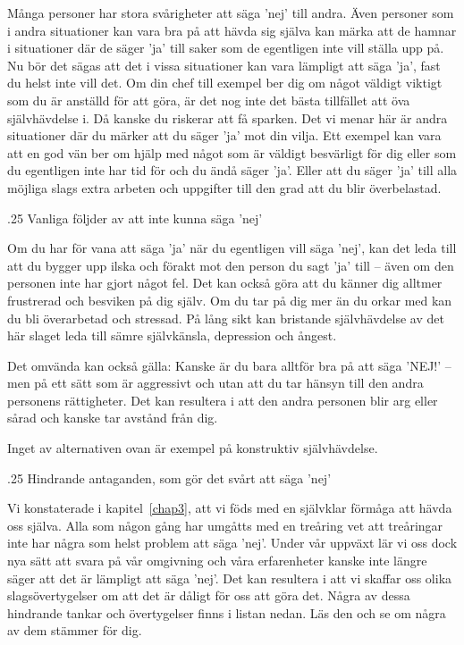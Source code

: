 \documentclass[swedish,a4paper]{book}
\makeatletter
\renewcommand\subsection{\@startsection{subsection}{1}{\z@}%
                                   {\baselineskip}%
                                   {.25\baselineskip}%
                                   {\fontsize{1\baselineskip}{1.25\baselineskip}\selectfont\sffamily\bfseries}} %
\makeatother
\begin{document}
Många personer har stora svårigheter att säga 'nej' till andra. Även personer som i andra situationer kan vara bra på att hävda sig själva kan märka att de hamnar i situationer där de säger 'ja' till saker som de egentligen inte vill ställa upp på. Nu bör det sägas att det i vissa situationer kan vara lämpligt att säga 'ja', fast du helst inte vill det. Om din chef till exempel ber dig om något väldigt viktigt som du är anställd för att göra, är det nog inte det bästa tillfället att öva självhävdelse i. Då kanske du riskerar att få sparken. Det vi menar här är andra situationer där du märker att du säger 'ja' mot din vilja. Ett exempel kan vara att en god vän ber om hjälp med något som är väldigt besvärligt för dig eller som du egentligen inte har tid för och du ändå säger 'ja'. Eller att du säger 'ja' till alla möjliga slags extra arbeten och uppgifter till den grad att du blir överbelastad.

\subsection{Vanliga följder av att inte kunna säga 'nej'}

Om du har för vana att säga 'ja' när du egentligen vill säga 'nej', kan det leda till att du bygger upp ilska och förakt mot den person du sagt 'ja' till -- även om den personen inte har gjort något fel. Det kan också göra att du känner dig alltmer frustrerad och besviken på dig själv. Om du tar på dig mer än du orkar med kan du bli överarbetad och stressad. På lång sikt kan bristande självhävdelse av det här slaget leda till sämre självkänsla, depression och ångest.

Det omvända kan också gälla: Kanske är du bara alltför bra på att säga 'NEJ!' -- men på ett sätt som är aggressivt och utan att du tar hänsyn till den andra personens rättigheter. Det kan resultera i att den andra personen blir arg eller sårad  och kanske tar avstånd från dig.

Inget av alternativen ovan är exempel på konstruktiv självhävdelse.

\subsection{Hindrande antaganden, som gör det svårt att säga 'nej'}

Vi konstaterade i kapitel~\ref{chap3}, \textit{} att vi föds med en självklar förmåga att hävda oss själva. Alla som någon gång har umgåtts med en treåring vet att treåringar inte har några som helst problem att säga 'nej'. Under vår uppväxt lär vi oss dock nya sätt att svara på vår omgivning och våra erfarenheter kanske inte längre säger att det är lämpligt att säga 'nej'. Det kan resultera i att vi skaffar oss olika slagsövertygelser om att det är dåligt för oss att göra det. Några av dessa hindrande tankar och övertygelser finns i listan nedan. Läs den och se om några av dem stämmer för dig.
\end{document}
